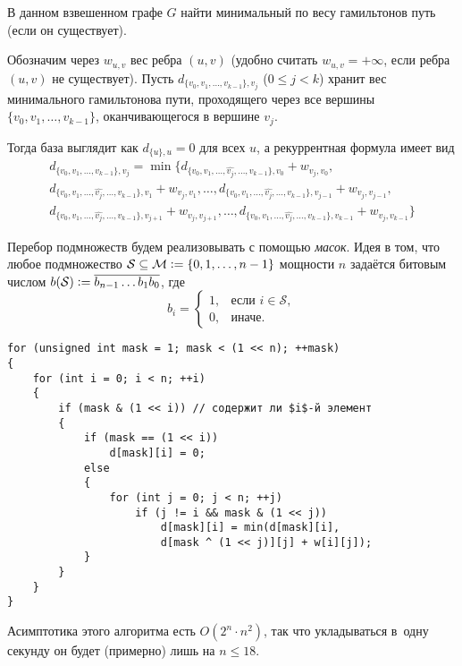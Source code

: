 \begin{problem}
    В данном взвешенном графе $G$ найти минимальный по весу гамильтонов путь (если он существует).
\end{problem}

Обозначим через $w_{u, v}$ вес ребра $(u, v)$ (удобно считать $w_{u, v} = +\infty$, если ребра $(u, v)$ не существует). Пусть $d_{\{v_0, v_1, \ldots, v_{k - 1}\}, v_j}$ ($0 \leqslant j < k$) хранит вес минимального гамильтонова пути, проходящего через все вершины $\{v_0, v_1, \ldots, v_{k - 1}\}$, оканчивающегося в вершине $v_j$.

Тогда база выглядит как $d_{\{u\}, u} = 0$ для всех $u$, а рекуррентная формула имеет вид
\begin{multline*}
    d_{\{v_0, v_1, \ldots, v_{k - 1}\}, v_j} = \min\{d_{\{v_0, v_1, \ldots, \widehat{v_j}, \ldots, v_{k - 1}\}, v_0} + w_{v_j, v_0},\\ d_{\{v_0, v_1, \ldots, \widehat{v_j}, \ldots, v_{k - 1}\}, v_1} + w_{v_j, v_1}, \ldots, d_{\{v_0, v_1, \ldots, \widehat{v_j}, \ldots, v_{k - 1}\}, v_{j - 1}} + w_{v_j, v_{j - 1}},\\ d_{\{v_0, v_1, \ldots, \widehat{v_j}, \ldots, v_{k - 1}\}, v_{j + 1}} + w_{v_j, v_{j + 1}}, \ldots, d_{\{v_0, v_1, \ldots, \widehat{v_j}, \ldots, v_{k - 1}\}, v_{k - 1}} + w_{v_j, v_{k - 1}}\}
\end{multline*}

Перебор подмножеств будем реализовывать с помощью \textit{масок}. Идея в том, что любое подмножество $\mathcal{S} \subseteq \mathcal{M} \vcentcolon = \{0, 1, \ldots, n - 1\}$ мощности $n$ задаётся битовым числом $b(\mathcal{S}) \vcentcolon = \overline{b_{n - 1}\ldots b_1b_0}$, где
\[
    b_i =
    \begin{cases}
        1,&\text{если $i \in \mathcal{S}$},\\
        0,&\text{иначе}.
    \end{cases}
\]

\begin{verbatim}
for (unsigned int mask = 1; mask < (1 << n); ++mask)
{
    for (int i = 0; i < n; ++i)
    {
        if (mask & (1 << i)) // содержит ли $i$-й элемент
        {
            if (mask == (1 << i))
                d[mask][i] = 0;
            else
            {
                for (int j = 0; j < n; ++j)
                    if (j != i && mask & (1 << j))
                        d[mask][i] = min(d[mask][i],
                        d[mask ^ (1 << j)][j] + w[i][j]);
            }
        }
    }
}
\end{verbatim}

Асимптотика этого алгоритма есть $O(2^n \cdot n^2)$, так что укладываться в~одну секунду он будет (примерно) лишь на $n \leqslant 18$.
